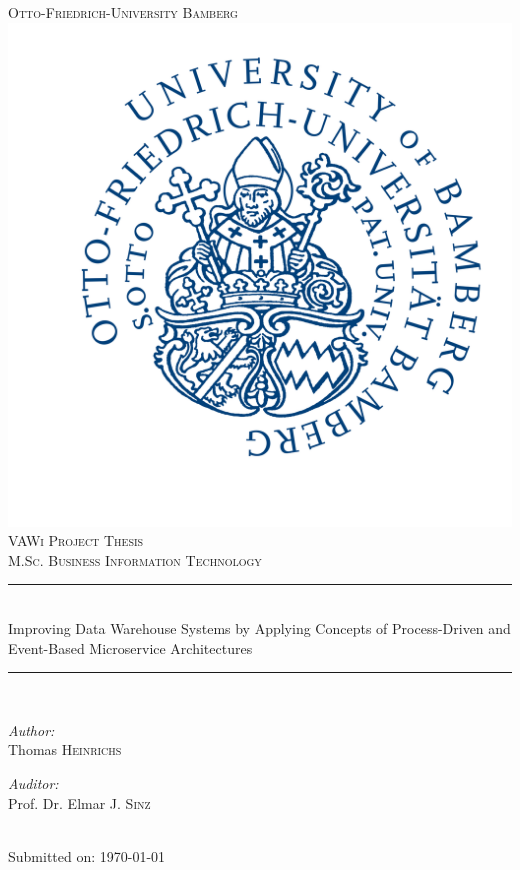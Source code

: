 
\begin{titlepage}
\newcommand{\HRule}{\rule{\linewidth}{0.5mm}} 
\center
\textsc{\LARGE Otto-Friedrich-University Bamberg}\\[1.5cm] 
\includegraphics[scale=0.1]{Logos/Otto-Friedrich-Universitaet_Bamberg_logo.png}\\
\textsc{\Large VAWi Project Thesis}\\[0.8cm] 
\textsc{\large M.Sc. Business Information Technology}\\[0.5cm]
\HRule \\[0.4cm]
{\Large Improving Data Warehouse Systems by Applying Concepts of Process-Driven and Event-Based Microservice Architectures}
\HRule \\[1cm]
\begin{minipage}{0.4\textwidth}
\begin{flushleft} \large
\emph{Author:}\\
Thomas\textsc{ Heinrichs}\\
\end{flushleft}
\end{minipage}
\begin{minipage}{0.4\textwidth}
\begin{flushright} \large
\emph{Auditor:} \\
Prof. Dr. Elmar J. \textsc{Sinz}\\
\end{flushright}
\end{minipage}\\[2cm]
{Submitted on: \large \today}\\[1.4cm] 
\vfill
\end{titlepage}